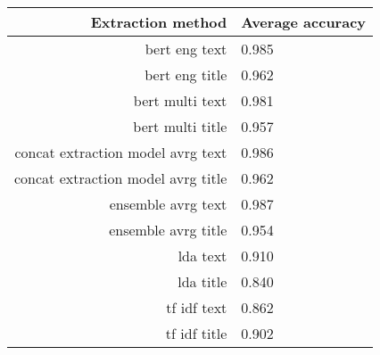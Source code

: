 \begin{tabular}{|r|l|}
  \hline
  Extraction method & Average accuracy \\ 
  \hline
  bert eng text & 0.985 \\ 
  \hline
  bert eng title & 0.962 \\ 
  \hline
  bert multi text & 0.981 \\ 
  \hline
  bert multi title & 0.957 \\ 
  \hline
  concat extraction model avrg text & 0.986 \\ 
  \hline
  concat extraction model avrg title & 0.962 \\ 
  \hline
  ensemble avrg text & 0.987 \\ 
  \hline
  ensemble avrg title & 0.954 \\ 
  \hline
  lda text & 0.910 \\ 
  \hline
  lda title & 0.840 \\ 
  \hline
  tf idf text & 0.862 \\ 
  \hline
  tf idf title & 0.902 \\ 
  \hline
\end{tabular}
